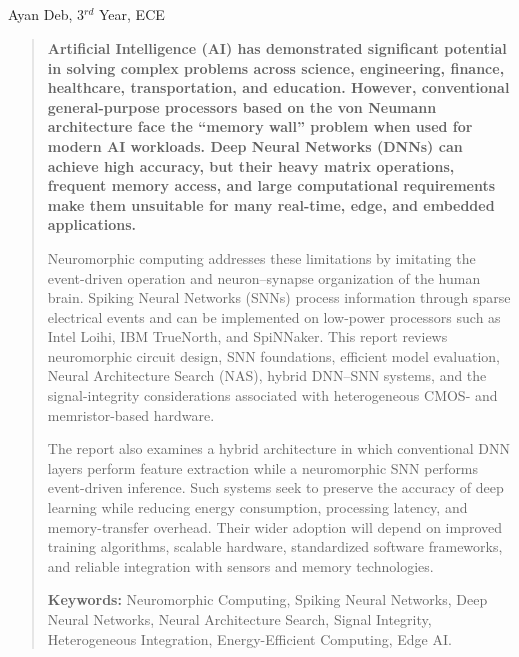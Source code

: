 \begin{center}
  \section[Brain-Inspired Neuromorphic Processors]{}
  Ayan Deb, 3$^{rd}$ Year, ECE
\end{center}

\setcounter{figure}{0}
\setcounter{table}{0}

\begin{multicols}{2}
  \begin{abstract}
    \bfseries
    Artificial Intelligence (AI) has demonstrated significant potential in solving complex problems across science, engineering, finance, healthcare, transportation, and education. However, conventional general-purpose processors based on the von Neumann architecture face the \textquotedblleft memory wall\textquotedblright{} problem when used for modern AI workloads. Deep Neural Networks (DNNs) can achieve high accuracy, but their heavy matrix operations, frequent memory access, and large computational requirements make them unsuitable for many real-time, edge, and embedded applications.

    \noindent
    Neuromorphic computing addresses these limitations by imitating the event-driven operation and neuron--synapse organization of the human brain. Spiking Neural Networks (SNNs) process information through sparse electrical events and can be implemented on low-power processors such as Intel Loihi, IBM TrueNorth, and SpiNNaker. This report reviews neuromorphic circuit design, SNN foundations, efficient model evaluation, Neural Architecture Search (NAS), hybrid DNN--SNN systems, and the signal-integrity considerations associated with heterogeneous CMOS- and memristor-based hardware.

    \noindent
    The report also examines a hybrid architecture in which conventional DNN layers perform feature extraction while a neuromorphic SNN performs event-driven inference. Such systems seek to preserve the accuracy of deep learning while reducing energy consumption, processing latency, and memory-transfer overhead. Their wider adoption will depend on improved training algorithms, scalable hardware, standardized software frameworks, and reliable integration with sensors and memory technologies.

    \vspace{1em}
    {\justifying\noindent\textbf{Keywords:} Neuromorphic Computing, Spiking Neural Networks, Deep Neural Networks, Neural Architecture Search, Signal Integrity, Heterogeneous Integration, Energy-Efficient Computing, Edge AI.\par}
  \end{abstract}


\end{multicols}
